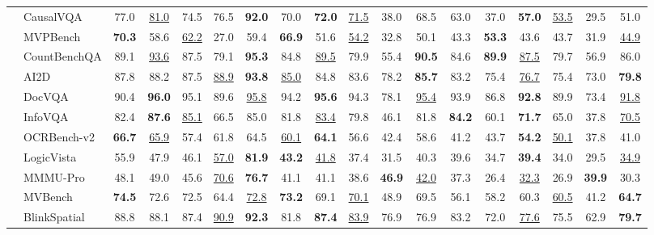 \begin{table}[p]
\begin{adjustbox}{width=\textwidth}
\begin{tabular}{@{}c l|>{\columncolor{columnours}}ccccc|>{\columncolor{columnours}}cccccc|>{\columncolor{columnours}}ccccc@{}}
        & CausalVQA & 77.0 & \underline{81.0} & 74.5 & 76.5 & \textbf{92.0} & 70.0 & \textbf{72.0} & \underline{71.5} & 38.0 & 68.5 & 63.0 & 37.0 & \textbf{57.0} & \underline{53.5} & 29.5 & 51.0 \\
        & MVPBench & \textbf{70.3} & 58.6 & \underline{62.2} & 27.0 & 59.4 & \textbf{66.9} & 51.6 & \underline{54.2} & 32.8 & 50.1 & 43.3 & \textbf{53.3} & 43.6 & 43.7 & 31.9 & \underline{44.9} \\
        & CountBenchQA & 89.1 & \underline{93.6} & 87.5 & 79.1 & \textbf{95.3} & 84.8 & \underline{89.5} & 79.9 & 55.4 & \textbf{90.5} & 84.6 & \textbf{89.9} & \underline{87.5} & 79.7 & 56.9 & 86.0 \\
        & AI2D & 87.8 & 88.2 & 87.5 & \underline{88.9} & \textbf{93.8} & \underline{85.0} & 84.8 & 83.6 & 78.2 & \textbf{85.7} & 83.2 & 75.4 & \underline{76.7} & 75.4 & 73.0 & \textbf{79.8} \\
        & DocVQA & 90.4 & \textbf{96.0} & 95.1 & 89.6 & \underline{95.8} & 94.2 & \textbf{95.6} & 94.3 & 78.1 & \underline{95.4} & 93.9 & 86.8 & \textbf{92.8} & 89.9 & 73.4 & \underline{91.8} \\
        & InfoVQA & 82.4 & \textbf{87.6} & \underline{85.1} & 66.5 & 85.0 & 81.8 & \underline{83.4} & 79.8 & 46.1 & 81.8 & \textbf{84.2} & 60.1 & \textbf{71.7} & 65.0 & 37.8 & \underline{70.5} \\
        & OCRBench-v2 & \textbf{66.7} & \underline{65.9} & 57.4 & 61.8 & 64.5 & \underline{60.1} & \textbf{64.1} & 56.6 & 42.4 & 58.6 & 41.2 & 43.7 & \textbf{54.2} & \underline{50.1} & 37.8 & 41.0 \\
        & LogicVista & 55.9 & 47.9 & 46.1 & \underline{57.0} & \textbf{81.9} & \textbf{43.2} & \underline{41.8} & 37.4 & 31.5 & 40.3 & 39.6 & 34.7 & \textbf{39.4} & 34.0 & 29.5 & \underline{34.9} \\
        & MMMU-Pro & 48.1 & 49.0 & 45.6 & \underline{70.6} & \textbf{76.7} & 41.1 & 41.1 & 38.6 & \textbf{46.9} & \underline{42.0} & 37.3 & 26.4 & \underline{32.3} & 26.9 & \textbf{39.9} & 30.3 \\
        & MVBench & \textbf{74.5} & 72.6 & 72.5 & 64.4 & \underline{72.8} & \textbf{73.2} & 69.1 & \underline{70.1} & 48.9 & 69.5 & 56.1 & 58.2 & 60.3 & \underline{60.5} & 41.2 & \textbf{64.7} \\
        & BlinkSpatial & 88.8 & 88.1 & 87.4 & \underline{90.9} & \textbf{92.3} & 81.8 & \textbf{87.4} & \underline{83.9} & 76.9 & 76.9 & 83.2 & 72.0 & \underline{77.6} & 75.5 & 62.9 & \textbf{79.7} \\

\end{tabular}
\end{adjustbox}
\end{table}
